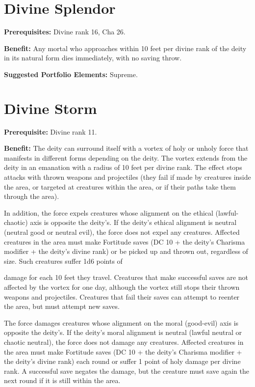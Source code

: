 \documentclass{article}
\begin{document}
\vspace{12pt}
\section*{Divine Splendor}

\textbf{Prerequisites:} Divine rank 16, Cha 26.

\textbf{Benefit:} Any mortal who approaches within 10 feet per divine rank of the 
deity in its natural form dies immediately, with no saving throw.

\textbf{Suggested Portfolio Elements:} Supreme.

\vspace{12pt}
\section*{Divine Storm}

\textbf{Prerequisite:} Divine rank 11.

\textbf{Benefit:} The deity can surround itself with a vortex of holy or unholy 
force that manifests in different forms depending on the deity. The vortex extends 
from the deity in an emanation with a radius of 10 feet per divine rank. The effect 
stops attacks with thrown weapons and projectiles (they fail if made by creatures 
inside the area, or targeted at creatures within the area, or if their paths take 
them through the area).

In addition, the force expels creatures whose alignment on the ethical (lawful-chaotic) 
axis is opposite the deity's. If the deity's ethical alignment is neutral (neutral 
good or neutral evil), the force does not expel any creatures. Affected creatures 
in the area must make Fortitude saves (DC 10 + the deity's Charisma modifier + 
the deity's divine rank) or be picked up and thrown out, regardless of size. Such 
creatures suffer 1d6 points of

damage for each 10 feet they travel. Creatures that make successful saves are not 
affected by the vortex for one day, although the vortex still stops their thrown 
weapons and projectiles. Creatures that fail their saves can attempt to reenter 
the area, but must attempt new saves.

The force damages creatures whose alignment on the moral (good-evil) axis is opposite 
the deity's. If the deity's moral alignment is neutral (lawful neutral or chaotic 
neutral), the force does not damage any creatures. Affected creatures in the area 
must make Fortitude saves (DC 10 + the deity's Charisma modifier + the deity's 
divine rank) each round or suffer 1 point of holy damage per divine rank. A successful 
save negates the damage, but the creature must save again the next round if it 
is still within the area.
\end{document}

